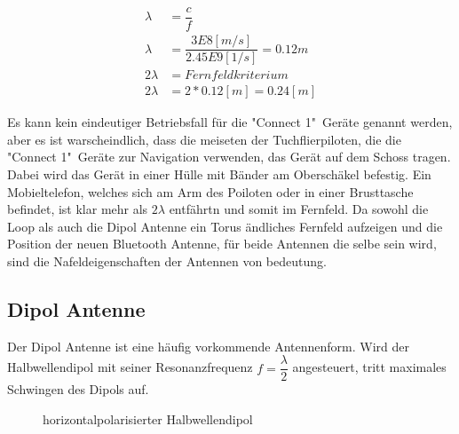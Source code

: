 \begin{align}\label{eq:Fernfeld}
\lambda &=\dfrac{c}{f} \\
\lambda &=\dfrac{3E8[m/s]}{2.45E9[1/s]}=0.12m\\ \nonumber
2\lambda &= Fernfeldkriterium\\ \nonumber
2\lambda &= 2*0.12[m] =0.24[m] \nonumber
\end{align}

Es kann kein eindeutiger Betriebsfall für die "Connect 1"\  Geräte genannt werden, aber es ist warscheindlich, dass die meiseten der Tuchflierpiloten, die die "Connect 1"\  Geräte zur Navigation verwenden, das Gerät auf dem Schoss tragen. Dabei wird das Gerät in einer Hülle mit Bänder am Oberschäkel befestig. Ein Mobieltelefon, welches sich am Arm des Poiloten oder in einer Brusttasche befindet, ist klar mehr als $2\lambda$ entfährtn und somit im Fernfeld. Da sowohl die Loop als auch die Dipol Antenne ein Torus ändliches Fernfeld aufzeigen und die Position der neuen Bluetooth Antenne, für beide Antennen die selbe sein wird, sind die Nafeldeigenschaften der Antennen von bedeutung.

\subsection{Dipol Antenne}
Der Dipol Antenne ist eine häufig vorkommende Antennenform.  Wird der Halbwellendipol mit seiner Resonanzfrequenz $f=\dfrac{\lambda}{2}$ angesteuert, tritt maximales Schwingen des Dipols auf.
\begin{figure}[h]%
	\begin{center}
	\end{center}
\caption{horizontalpolarisierter Halbwellendipol}
\label{fig:HalbWellenDipolHorizontal}
\end{figure}


